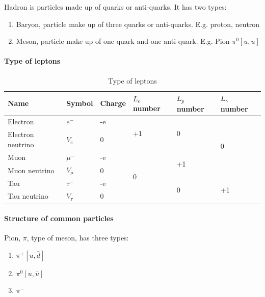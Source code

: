             Hadron is particles made up of quarks or anti-quarks. It has two types:
            \begin{enumerate}
                \item Baryon, particle make up of three quarks or anti-quarks. E.g. proton, neutron
                \item Meson, particle make up of one quark and one anti-quark. E.g. Pion $\pi^0 [u, \bar{u}]$
            \end{enumerate}

        \paragraph{Type of leptons}
            \begin{table}[H]
                \begin{center}
                    \begin{tabular}{|l|l|l|l|l|l|}
                        \hline
                        Name & Symbol & Charge & $L_e$ number & $L_p$ number & $L_\gamma$ number \\ \hline
                        Electron & $e^-$ & -e & \multirow{2}{*}{+1} & \multirow{2}{*}{0} & \multirow{4}{*}{0} \\ \cline{1-3}
                        Electron neutrino & $V_e$ & 0 & & & \\ \cline{1-5}
                        Muon & $\mu^-$ & -e & \multirow{4}{*}{0} & \multirow{2}{*}{+1} &  \\ \cline{1-3}
                        Muon neutrino & $V_\mu$ & 0 & & & \\ \cline{1-3} \cline{5-6}
                        Tau & $\tau^-$ & -e & & \multirow{2}{*}{0} & \multirow{2}{*}{+1} \\ \cline{1-3}
                        Tau neutrino & $V_\tau$ & 0 & & & \\ \hline
                    \end{tabular}
                \end{center}
                \caption{Type of leptons}
                \label{type_of_lep}
            \end{table}
        
        \paragraph{Structure of common particles}
            Pion, $\pi$, type of meson, has three types:
            \begin{enumerate}
                \item $\pi^+ [u, \bar{d}]$
                \item $\pi^0 [u, \bar{u}]$
                \item $\pi^-$
            \end{enumerate}
        
